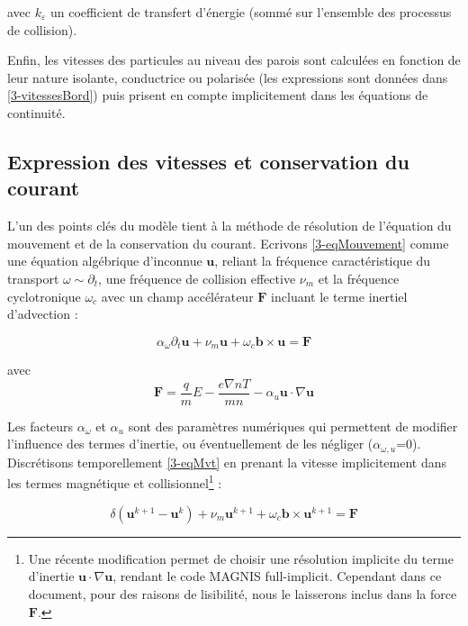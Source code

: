 \begin{refsection}
avec $k_\varepsilon$ un coefficient de transfert d'énergie (sommé sur 
l'ensemble des processus de collision).

Enfin, les vitesses des particules au niveau des parois sont calculées en
fonction de leur nature isolante, conductrice ou polarisée (les expressions
sont données dans \ref{3-vitessesBord}) puis prisent en compte implicitement
dans les équations de continuité.

\subsection{Expression des vitesses et conservation du courant}
L'un des points clés du modèle tient à la méthode de résolution de l'équation du
mouvement et de la conservation du courant. Ecrivons \eqref{3-eqMouvement} comme
une équation algébrique d'inconnue $\mathbf u$, reliant la fréquence caractéristique du transport
$\omega\sim\partial_t$, une fréquence de collision effective $\nu_m$ et la
fréquence cyclotronique $\omega_c$ avec un champ
accélérateur $\mathbf F$ incluant le terme inertiel d'advection :

\begin{equation}
\label{3-eqMvt}
\alpha_\omega\partial_t \mathbf{u} + 
\nu_m\mathbf{u}+\omega_{c}\mathbf{b}\times\mathbf{u}=
\mathbf F
\end{equation}

avec 
\begin{equation*}\mathbf F=\frac{q}{m}E-\frac{e\nabla
n T}{m
n}-\alpha_u\mathbf{u}\cdot\nabla\mathbf{u}
\end{equation*}

Les facteurs $\alpha_\omega$ et $\alpha_u$ sont des paramètres numériques qui
permettent de modifier l'influence des termes d'inertie, ou éventuellement de
les négliger ($\alpha_{\omega,u}$=0). Discrétisons temporellement
\eqref{3-eqMvt} en prenant la vitesse implicitement dans les termes
magnétique et collisionnel\footnote{Une récente modification permet de choisir
une résolution implicite du terme
d'inertie $\mathbf{u}\cdot\nabla\mathbf{u}$, rendant le code MAGNIS
full-implicit. Cependant dans ce document, pour des raisons de lisibilité, nous
le laisserons inclus dans la force $\mathbf F$.} :

\begin{equation}
\label{3-eqMvtDiscretT}
\delta\left(\mathbf{u}^{k+1}-\mathbf{u}^{k}\right) + 
\nu_m\mathbf{u}^{k+1}+\omega_{c}\mathbf{b}\times\mathbf{u}^{k+1}=
\mathbf F
\end{equation}


\end{refsection}
